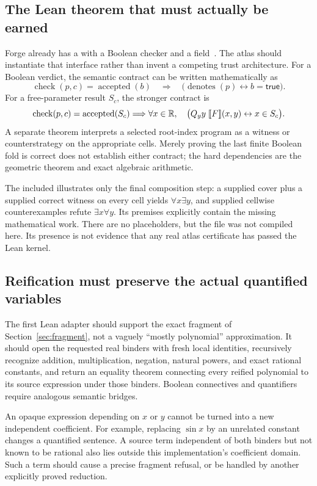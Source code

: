 \subsection{The Lean theorem that must actually be earned}
Forge already has a  with a Boolean checker and a  field~\cite{forge-contract}. The atlas should instantiate that interface rather than invent a competing trust architecture. For a Boolean verdict, the semantic contract can be written mathematically as
\[
 \operatorname{check}(p,c)=\operatorname{accepted}(b)
 \quad\Longrightarrow\quad
 \bigl(\operatorname{denotes}(p)\leftrightarrow b=\mathsf{true}\bigr).
\]
For a free-parameter result $S_c$, the stronger contract is
\[
 \operatorname{check}(p,c)=\operatorname{accepted}(S_c)
 \Longrightarrow
 \forall x\in\mathbb R,\quad
 \bigl(Q_y y\;\llbracket F\rrbracket(x,y)\leftrightarrow x\in S_c\bigr).
\]
A separate theorem interprets a selected root-index program as a witness or counterstrategy on the appropriate cells. Merely proving the last finite Boolean fold is correct does not establish either contract; the hard dependencies are the geometric theorem and exact algebraic arithmetic.

The included  illustrates only the final composition step: a supplied cover plus a supplied correct witness on every cell yields $\forall x\exists y$, and supplied cellwise counterexamples refute $\exists x\forall y$. Its premises explicitly contain the missing mathematical work. There are no  placeholders, but the file was not compiled here. Its presence is not evidence that any real atlas certificate has passed the Lean kernel.

\subsection{Reification must preserve the actual quantified variables}
The first Lean adapter should support the exact fragment of Section~\ref{sec:fragment}, not a vaguely ``mostly polynomial'' approximation. It should open the requested real binders with fresh local identities, recursively recognize addition, multiplication, negation, natural powers, and exact rational constants, and return an equality theorem connecting every reified polynomial to its source expression under those binders. Boolean connectives and quantifiers require analogous semantic bridges.

An opaque expression depending on $x$ or $y$ cannot be turned into a new independent coefficient. For example, replacing $\sin x$ by an unrelated constant changes a quantified sentence. A source term independent of both binders but not known to be rational also lies outside this implementation's coefficient domain. Such a term should cause a precise fragment refusal, or be handled by another explicitly proved reduction.

